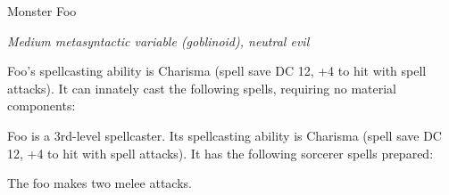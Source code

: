 \documentclass[letterpaper,10pt,twoside,twocolumn,openany]{dndbook}
\begin{document}
\begin{monsterbox}{Monster Foo}
  \begin{hangingpar}
    \textit{Medium metasyntactic variable (goblinoid), neutral evil}
  \end{hangingpar}
  \dndline%
  \basics[%
  armorclass = 9 (12 with \emph{mage armor}),
  hitpoints  = \dice{3d8 + 3},
  speed      = {30 ft., fly 30 ft.},
  ]
  \dndline%
  \stats[
    STR = \stat{12}, %
    DEX = \stat{8},
    CON = \stat{13},
    INT = \stat{10},
    WIS = \stat{14},
    CHA = \stat{15},
  ]
  \dndline%
  \details[%
    senses = {darkvision 60 ft., passive Perception 10},
    languages = {Common, Goblin},
    challenge = {1},
  ]
  \dndline%

	
	\begin{monsteraction}
		Foo's spellcasting ability is Charisma (spell save DC 12, +4 to hit with spell attacks). It can innately cast the following spells, requiring no material components:
  \end{monsteraction}
  
  \begin{monsteraction}[Spellcasting]
    Foo is a 3rd-level spellcaster. Its spellcasting ability is Charisma (spell save DC 12, +4 to hit with spell attacks). It has the following sorcerer spells prepared:
  \end{monsteraction}

  \begin{monsteraction}[Multiattack]
    The foo makes two melee attacks.
  \end{monsteraction}


\end{monsterbox}
\end{document}
